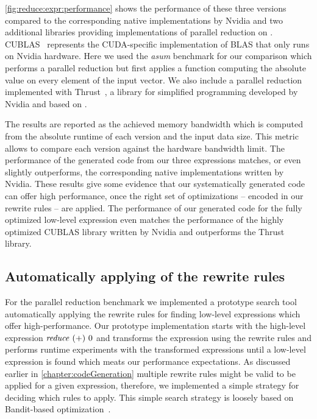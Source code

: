 \autoref{fig:reduce:expr:performance} shows the performance of these three versions compared to the corresponding native \OpenCL implementations by Nvidia and two additional libraries providing implementations of parallel reduction on \GPUs.
CUBLAS~\cite{cuBLAS} represents the CUDA-specific implementation of BLAS that only runs on Nvidia hardware.
Here we used the \emph{asum} benchmark for our comparison which performs a parallel reduction but first applies a function computing the absolute value on every element of the input vector.
We also include a parallel reduction implemented with Thrust~\cite{BellHo2011}, a library for simplified \GPU programming developed by Nvidia and based on \CUDA.

The results are reported as the achieved memory bandwidth which is computed from the absolute runtime of each version and the input data size.
This metric allows to compare each version against the hardware bandwidth limit.
The performance of the generated \OpenCL code from our three expressions matches, or even slightly outperforms, the corresponding native \OpenCL implementations written by Nvidia.
These results give some evidence that our systematically generated code can offer high performance, once the right set of optimizations -- encoded in our rewrite rules -- are applied.
The performance of our generated code for the fully optimized low-level expression even matches the performance of the highly optimized CUBLAS library written by Nvidia and outperforms the Thrust library.

\subsection{Automatically applying of the rewrite rules}

For the parallel reduction benchmark we implemented a prototype search tool automatically applying the rewrite rules for finding low-level expressions which offer high-performance.
Our prototype implementation starts with the high-level expression $\text{\textit{reduce}}\ (+)\ 0$ and transforms the expression using the rewrite rules and performs runtime experiments with the transformed expressions until a low-level \OpenCL expression is found which meats our performance expectations.
As discussed earlier in \autoref{chapter:codeGeneration} multiple rewrite rules might be valid to be applied for a given expression, therefore, we implemented a simple strategy for deciding which rules to apply.
This simple search strategy is loosely based on Bandit-based optimization~\cite{}.


